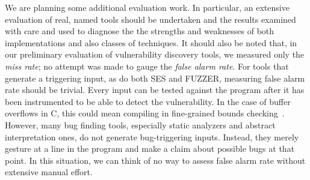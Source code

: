 We are planning some additional evaluation work.
In particular, an extensive evaluation of real, named tools should be undertaken and the results examined with care and used to diagnose the the strengths and weaknesses of both implementations and also classes of techniques.
It should also be noted that, in our preliminary evaluation of vulnerability discovery tools, we measured only the \emph{miss rate}; no attempt was made to gauge the \emph{false alarm rate}.
For tools that generate a triggering input, as do both SES and FUZZER, measuring false alarm rate should be trivial. 
Every input can be tested against the program after it has been instrumented to be able to detect the vulnerability.
In the case of buffer overflows in C, this could mean compiling in fine-grained bounds checking~\cite{ruwase2004practical}.
However, many bug finding tools, especially static analyzers and abstract interpretation ones, do not generate bug-triggering inputs.
Instead, they merely gesture at a line in the program and make a claim about possible bugs at that point.
In this situation, we can think of no way to assess false alarm rate without extensive manual effort.
